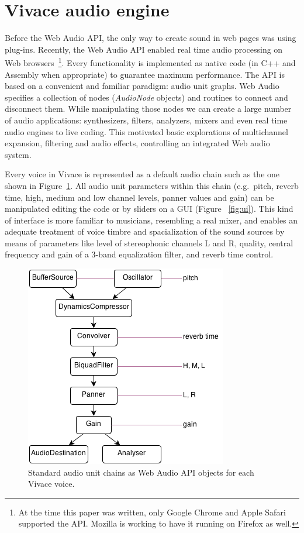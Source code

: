 \documentclass[letterpaper, 12pt]{article}
\begin{document}
\section{Vivace audio engine}

Before the Web Audio API, the only way to create sound in web pages
was using plug-ins. Recently, the Web Audio API enabled real time
audio processing on Web browsers~\footnote{At the time this paper was
  written, only Google Chrome and Apple Safari supported the
  API. Mozilla is working to have it running on Firefox as
  well.}. Every functionality is implemented as native code (in C++
and Assembly when appropriate) to guarantee maximum performance. The
API is based on a convenient and familiar paradigm: audio unit
graphs. Web Audio specifies a collection of nodes (\emph{AudioNode}
objects) and routines to connect and disconnect them. While
manipulating those nodes we can create a large number of audio
applications: synthesizers, filters, analyzers, mixers and even real
time audio engines to live coding. This motivated basic explorations
of multichannel expansion, filtering and audio effects, controlling an
integrated Web audio system.

Every voice in Vivace is represented as a default audio chain such as
the one shown in Figure~\ref{fig:chain}. All audio unit parameters
within this chain (e.g.\ pitch, reverb time, high, medium and low
channel levels, panner values and gain) can be manipulated editing the
code or by sliders on a GUI (Figure ~\ref{fig:ui}). This kind of
interface is more familiar to musicians, resembling a real mixer, and
enables an adequate treatment of voice timbre and spacialization of
the sound sources by means of parameters like level of stereophonic
channels L and R, quality, central frequency and gain of a 3-band
equalization filter, and reverb time control.

\begin{figure}[htpb]
  \begin{center}
    \includegraphics[scale=.5]{img/fig_chain.png}
    \caption{Standard audio unit chains as Web Audio API objects for
      each Vivace voice.}
    \label{fig:chain}
  \end{center}
\end{figure}
\end{document}
